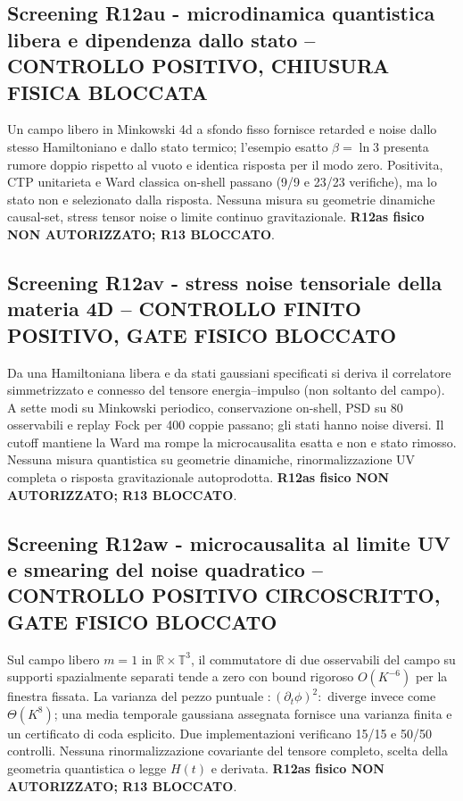 \documentclass[11pt,a4paper]{article}
\begin{document}
\subsection*{Screening R12au - microdinamica quantistica libera e dipendenza dallo stato -- CONTROLLO POSITIVO, CHIUSURA FISICA BLOCCATA}
Un campo libero in Minkowski 4d a sfondo fisso fornisce retarded e noise dallo stesso Hamiltoniano e dallo stato termico; l'esempio esatto $\beta=\ln 3$ presenta rumore doppio rispetto al vuoto e identica risposta per il modo zero. Positivita, CTP unitarieta e Ward classica on-shell passano (9/9 e 23/23 verifiche), ma lo stato non e selezionato dalla risposta. Nessuna misura su geometrie dinamiche causal-set, stress tensor noise o limite continuo gravitazionale. \textbf{R12as fisico NON AUTORIZZATO; R13 BLOCCATO}.\par\medskip

\subsection*{Screening R12av - stress noise tensoriale della materia 4D -- CONTROLLO FINITO POSITIVO, GATE FISICO BLOCCATO}
Da una Hamiltoniana libera e da stati gaussiani specificati si deriva il correlatore simmetrizzato e connesso del tensore energia--impulso (non soltanto del campo). A sette modi su Minkowski periodico, conservazione on-shell, PSD su 80 osservabili e replay Fock per 400 coppie passano; gli stati hanno noise diversi. Il cutoff mantiene la Ward ma rompe la microcausalita esatta e non e stato rimosso. Nessuna misura quantistica su geometrie dinamiche, rinormalizzazione UV completa o risposta gravitazionale autoprodotta. \textbf{R12as fisico NON AUTORIZZATO; R13 BLOCCATO}.\par\medskip

\subsection*{Screening R12aw - microcausalita al limite UV e smearing del noise quadratico -- CONTROLLO POSITIVO CIRCOSCRITTO, GATE FISICO BLOCCATO}
Sul campo libero $m=1$ in $\mathbb R\times\mathbb T^3$, il commutatore di due osservabili del campo su supporti spazialmente separati tende a zero con bound rigoroso $O(K^{-6})$ per la finestra fissata. La varianza del pezzo puntuale $:\!(\partial_t\phi)^2\!:$ diverge invece come $\Theta(K^8)$; una media temporale gaussiana assegnata fornisce una varianza finita e un certificato di coda esplicito. Due implementazioni verificano 15/15 e 50/50 controlli. Nessuna rinormalizzazione covariante del tensore completo, scelta della geometria quantistica o legge $H(t)$ e derivata. \textbf{R12as fisico NON AUTORIZZATO; R13 BLOCCATO}.\par\medskip
\end{document}
